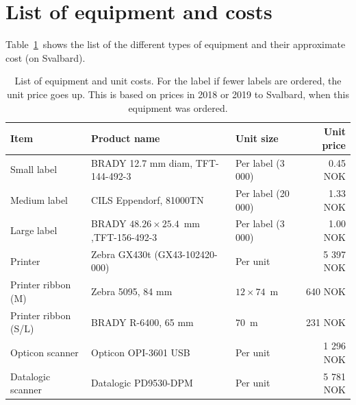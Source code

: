 \documentclass[a4paper,english, 11pt]{article}
\begin{document}
\section{List of equipment and costs} %
\label{sec:Costs}
Table~\ref{tab:costs} shows the list of the different types of equipment and their approximate cost (on Svalbard). 
\begin{table}[htb]
    \caption{\label{tab:costs}List of equipment and unit costs. For the label if fewer labels are ordered, the unit price goes up. This is based on prices in 2018 or 2019 to Svalbard, when this equipment was ordered.}
    \begin{tabular}{lllr}
        \hline
        \textbf{Item} & \textbf{Product name} & \textbf{Unit size} & \textbf{Unit price} \\ \hline
        Small label     & BRADY 12.7 mm diam, TFT-144-492-3  & Per label  (3 000)   & 0.45 NOK  \\ 
        Medium label    & CILS Eppendorf, 81000TN & Per label  (20 000)   & 1.33 NOK  \\ 
        Large label     & BRADY $48.26\times 25.4$ mm ,TFT-156-492-3      & Per label  (3 000)   & 1.00 NOK  \\ 
        Printer         & Zebra GX430t (GX43-102420-000)            & Per unit              & 5 397 NOK  \\ 
        Printer ribbon (M)  & Zebra 5095, 84 mm &     $ 12\times74$~m         & 640  NOK   \\ 
        Printer ribbon (S/L)  & BRADY R-6400, 65 mm &     $ 70$~m         & 231  NOK   \\ 
        Opticon scanner & Opticon OPI-3601 USB    & Per unit              & 1 296 NOK  \\ 
        Datalogic scanner & Datalogic PD9530-DPM  & Per unit              & 5 781 NOK  \\ 
        \hline
    \end{tabular}
\end{table}


\end{document}
